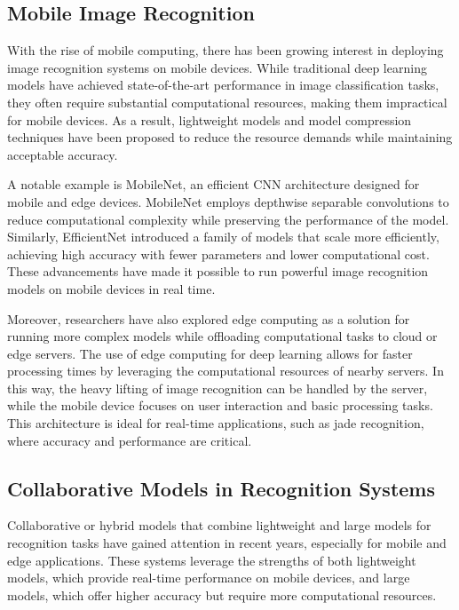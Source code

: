 \subsection{Mobile Image Recognition}

With the rise of mobile computing, there has been growing interest in deploying image recognition systems on mobile devices. While traditional deep learning models have achieved state-of-the-art performance in image classification tasks, they often require substantial computational resources, making them impractical for mobile devices. As a result, lightweight models and model compression techniques have been proposed to reduce the resource demands while maintaining acceptable accuracy.

A notable example is MobileNet, an efficient CNN architecture designed for mobile and edge devices. MobileNet employs depthwise separable convolutions to reduce computational complexity while preserving the performance of the model. Similarly, EfficientNet introduced a family of models that scale more efficiently, achieving high accuracy with fewer parameters and lower computational cost. These advancements have made it possible to run powerful image recognition models on mobile devices in real time.

Moreover, researchers have also explored edge computing as a solution for running more complex models while offloading computational tasks to cloud or edge servers. The use of edge computing for deep learning allows for faster processing times by leveraging the computational resources of nearby servers. In this way, the heavy lifting of image recognition can be handled by the server, while the mobile device focuses on user interaction and basic processing tasks. This architecture is ideal for real-time applications, such as jade recognition, where accuracy and performance are critical.

\subsection{Collaborative Models in Recognition Systems}

Collaborative or hybrid models that combine lightweight and large models for recognition tasks have gained attention in recent years, especially for mobile and edge applications. These systems leverage the strengths of both lightweight models, which provide real-time performance on mobile devices, and large models, which offer higher accuracy but require more computational resources.


